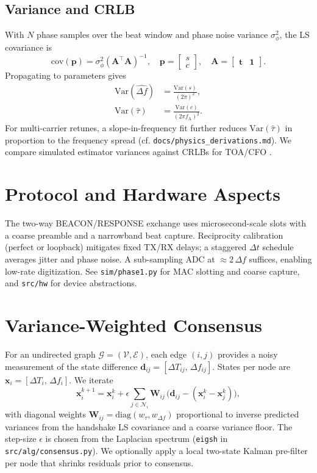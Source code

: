 \documentclass[10pt]{article}
\begin{document}
\subsection{Variance and CRLB}
With $N$ phase samples over the beat window and phase noise variance $\sigma_\phi^2$, the LS covariance is
\begin{equation}
\mathrm{cov}(\mathbf{p}) = \sigma_\phi^2 (\mathbf{A}^\top \mathbf{A})^{-1}, \quad \mathbf{p} = \begin{bmatrix} s \\ c \end{bmatrix}, \quad \mathbf{A} = \begin{bmatrix} \mathbf{t} & \mathbf{1} \end{bmatrix}.
\end{equation}
Propagating to parameters gives
\begin{align}
\mathrm{Var}(\hat{\Delta f}) &= \frac{\mathrm{Var}(s)}{(2\pi)^2}, \\
\mathrm{Var}(\hat{\tau}) &= \frac{\mathrm{Var}(c)}{(2\pi f_\mathrm{A})^2}.
\end{align}
For multi-carrier retunes, a slope-in-frequency fit further reduces $\mathrm{Var}(\hat{\tau})$ in proportion to the frequency spread (cf. \verb|docs/physics_derivations.md|). We compare simulated estimator variances against CRLBs for TOA/CFO \citep{VanDeBeek2001CRLB,Lima2021CRLB_TOA_CFO}.

\section{Protocol and Hardware Aspects}
The two-way BEACON/RESPONSE exchange uses microsecond-scale slots with a coarse preamble and a narrowband beat capture. Reciprocity calibration (perfect or loopback) mitigates fixed TX/RX delays; a staggered \(\Delta t\) schedule averages jitter and phase noise. A sub-sampling ADC at \(\approx 2\,\Delta f\) suffices, enabling low-rate digitization. See \verb|sim/phase1.py| for MAC slotting and coarse capture, and \verb|src/hw| for device abstractions.

\section{Variance-Weighted Consensus}
For an undirected graph \(\mathcal{G}=(\mathcal{V},\mathcal{E})\), each edge \((i,j)\) provides a noisy measurement of the state difference \(\mathbf{d}_{ij} = [\Delta T_{ij},\, \Delta f_{ij}]\). States per node are \(\mathbf{x}_i = [\Delta T_i,\, \Delta f_i]\). We iterate
\begin{equation}
\label{eq:consensus}
\mathbf{x}_i^{k+1} = \mathbf{x}_i^{k} + \epsilon \sum_{j\in\mathcal{N}_i} \mathbf{W}_{ij}\,\big(\mathbf{d}_{ij} - (\mathbf{x}_i^{k} - \mathbf{x}_j^{k})\big),
\end{equation}
with diagonal weights \(\mathbf{W}_{ij} = \mathrm{diag}(w_\tau, w_{\Delta f})\) proportional to inverse predicted variances from the handshake LS covariance and a coarse variance floor. The step-size \(\epsilon\) is chosen from the Laplacian spectrum (\verb|eigsh| in \verb|src/alg/consensus.py|). We optionally apply a local two-state Kalman pre-filter per node that shrinks residuals prior to consensus.
\end{document}
